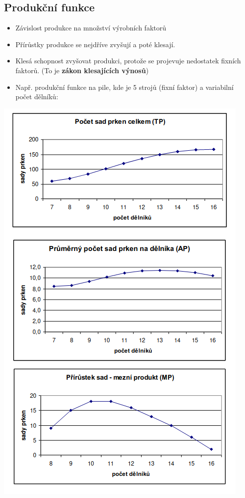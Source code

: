 \subsection{Produkční funkce}
\begin{itemize}
    \item Závislost produkce na množství výrobních faktorů
    \item Přírůstky produkce se nejdříve zvyšují a poté klesají.
    \item Klesá schopnost zvyšovat produkci, protože se projevuje nedostatek fixních faktorů.
    (To je \textbf{zákon klesajících výnosů})
    \item Např. produkční funkce na pile, kde je 5 strojů (fixní faktor) a variabilní počet dělníků:
\end{itemize}
\includegraphics[]{images/16_prod_f.png}

